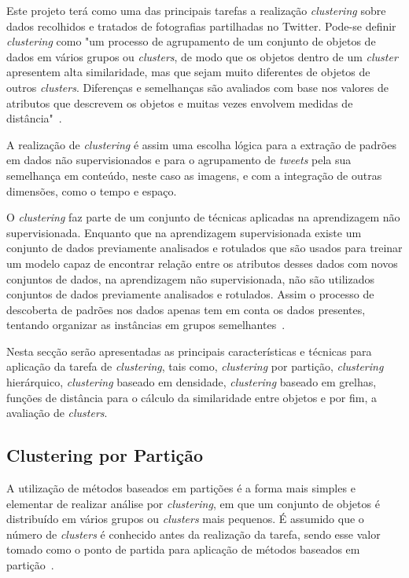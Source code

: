 Este projeto terá como uma das principais tarefas a realização \textit{clustering} sobre dados recolhidos e tratados de fotografias partilhadas no Twitter. Pode-se definir \textit{clustering} como "um processo de agrupamento de um conjunto de objetos de dados em vários grupos ou \textit{clusters}, de modo que os objetos dentro de um \textit{cluster} apresentem alta similaridade, mas que sejam muito diferentes de objetos de outros \textit{clusters}. Diferenças e semelhanças são avaliados com base nos valores de atributos que descrevem os objetos e muitas vezes envolvem medidas de distância"~\citet{Han2006}.

A realização de \textit{clustering} é assim uma escolha lógica para a extração de padrões em dados não supervisionados e para o agrupamento de \textit{tweets} pela sua semelhança em conteúdo, neste caso as imagens, e com a integração de outras dimensões, como o tempo e espaço.

O \textit{clustering} faz parte de um conjunto de técnicas aplicadas na aprendizagem não supervisionada. Enquanto que na aprendizagem supervisionada existe um conjunto de dados previamente analisados e rotulados que são usados para treinar um modelo capaz de encontrar relação entre os atributos desses dados com novos conjuntos de dados, na aprendizagem não supervisionada, não são utilizados conjuntos de dados previamente analisados e rotulados. Assim o processo de descoberta de padrões nos dados apenas tem em conta os dados presentes, tentando organizar as instâncias em grupos semelhantes~\citet{Liu2011}.

Nesta secção serão apresentadas as principais características e técnicas para aplicação da tarefa de \textit{clustering}, tais como, \textit{clustering} por partição, \textit{clustering} hierárquico, \textit{clustering} baseado em densidade, \textit{clustering} baseado em grelhas, funções de distância para o cálculo da similaridade entre objetos e por fim, a avaliação de \textit{clusters}.


\subsection{Clustering por Partição} \label{subsec:parti}

A utilização de métodos baseados em partições é a forma mais simples e elementar de realizar análise por \textit{clustering}, em que um conjunto de objetos é distribuído em vários grupos ou \textit{clusters} mais pequenos. É assumido que o número de \textit{clusters} é conhecido antes da realização da tarefa, sendo esse valor tomado como o ponto de partida para aplicação de métodos baseados em partição~\citet{Han2006}. 

